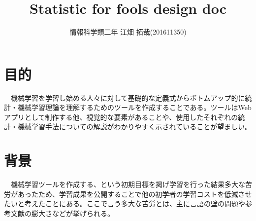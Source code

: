 \documentclass{scrartcl}
\author{情報科学類二年 江畑 拓哉(201611350)}
\date{}
\title{Statistic for fools design doc}
\begin{document}
\maketitle
\tableofcontents


\section{目的}
\label{sec:org4e61f86}
　機械学習を学習し始める人々に対して基礎的な定義式からボトムアップ的に統計・機械学習理論を理解するためのツールを作成することである。ツールはWebアプリとして制作する他、視覚的な要素があることや、使用したそれぞれの統計・機械学習手法についての解説がわかりやすく示されていることが望ましい。\\

\section{背景}
\label{sec:orgfe5ddae}
　機械学習ツールを作成する、という初期目標を掲げ学習を行った結果多大な苦労があったため、学習成果を公開することで他の初学者の学習コストを低減させたいと考えたことにある。ここで言う多大な苦労とは、主に言語の壁の問題や参考文献の膨大さなどが挙げられる。\\
\end{document}
